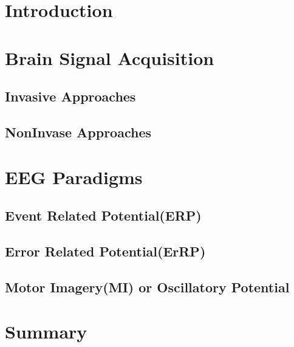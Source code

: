 \section*{Introduction}

\section{Brain Signal Acquisition}

    \subsection{Invasive Approaches}

    \subsection{NonInvase Approaches}

\section{EEG Paradigms}

    \subsection{Event Related Potential(ERP)}

    \subsection{Error Related Potential(ErRP)}

    \subsection{Motor Imagery(MI) or Oscillatory Potential}


\section*{Summary}